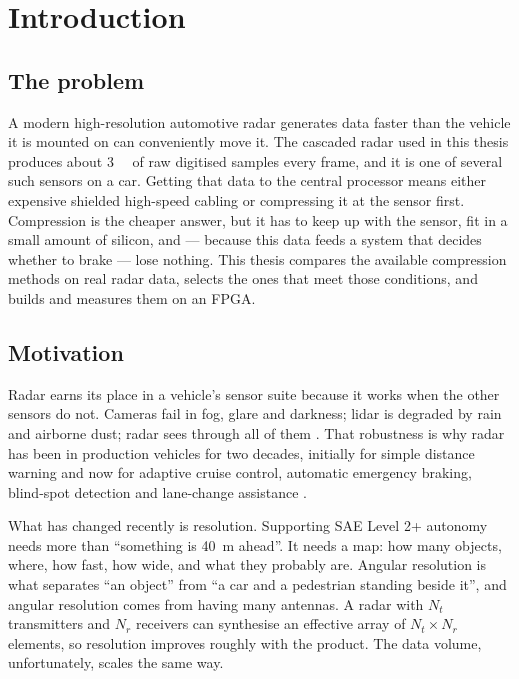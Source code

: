 \chapter{Introduction}
\label{ch:intro}

\section{The problem}

A modern high-resolution automotive radar generates data faster than the
vehicle it is mounted on can conveniently move it. The cascaded radar used in
this thesis produces about \SI{3}{\mebi\byte} of raw digitised samples every
frame, and it is one of several such sensors on a car. Getting that data to the
central processor means either expensive shielded high-speed cabling or
compressing it at the sensor first. Compression is the cheaper answer, but it
has to keep up with the sensor, fit in a small amount of silicon, and --- because
this data feeds a system that decides whether to brake --- lose nothing. This
thesis compares the available compression methods on real radar data, selects
the ones that meet those conditions, and builds and measures them on an FPGA.

\section{Motivation}
\label{sec:motivation}

Radar earns its place in a vehicle's sensor suite because it works when the
other sensors do not. Cameras fail in fog, glare and darkness; lidar is
degraded by rain and airborne dust; radar sees through all of them
\cite{waldschmidt2021,yao2023}. That robustness is why radar has been in
production vehicles for two decades, initially for simple distance warning and
now for adaptive cruise control, automatic emergency braking, blind-spot
detection and lane-change assistance \cite{skolnik2008}.

What has changed recently is resolution. Supporting SAE Level 2+ autonomy needs
more than ``something is \SI{40}{\metre} ahead''. It needs a map: how many
objects, where, how fast, how wide, and what they probably are. Angular
resolution is what separates ``an object'' from ``a car and a pedestrian
standing beside it'', and angular resolution comes from having many antennas.
A radar with $N_t$ transmitters and $N_r$ receivers can synthesise an effective
array of $N_t \times N_r$ elements, so resolution improves roughly with the
product. The data volume, unfortunately, scales the same way.


